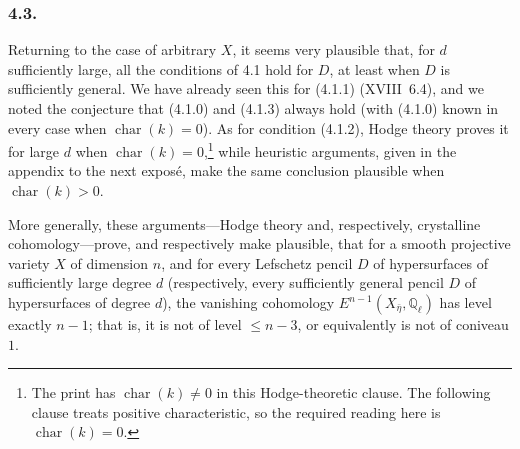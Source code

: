 \subsubsection*{4.3.}
Returning to the case of arbitrary $X$, it seems very plausible that, for
$d$ sufficiently large, all the conditions of 4.1 hold for $D$, at least
when $D$ is sufficiently general.  We have already seen this for (4.1.1)
(XVIII~6.4), and we noted the conjecture that (4.1.0) and (4.1.3) always
hold (with (4.1.0) known in every case when $\operatorname{char}(k)=0$).
As for condition (4.1.2), Hodge theory proves it for large $d$ when
$\operatorname{char}(k)=0$,\footnote{The print has
$\operatorname{char}(k)\ne0$ in this Hodge-theoretic clause.  The following
clause treats positive characteristic, so the required reading here is
$\operatorname{char}(k)=0$.} while heuristic arguments, given in the
appendix to the next exposé, make the same conclusion plausible when
$\operatorname{char}(k)>0$.

More generally, these arguments---Hodge theory and, respectively,
crystalline cohomology---prove, and respectively make plausible, that for
a smooth projective variety $X$ of dimension $n$, and for every Lefschetz
pencil $D$ of hypersurfaces of sufficiently large degree $d$ (respectively,
every sufficiently general pencil $D$ of hypersurfaces of degree $d$), the
vanishing cohomology
$E^{n-1}(X_{\bar\eta},\mathbb Q_\ell)$ has level exactly $n-1$; that is, it
is not of level $\leq n-3$, or equivalently is not of coniveau $1$.
